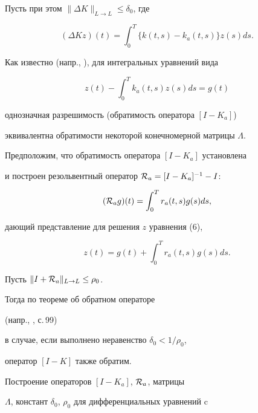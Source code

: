 %


Пусть при этом $\|\Delta K\|_{L \to L} \le \delta_0$, где


%


$$


(\Delta Kz)(t)  =  \int_0^T \{ k(t,s) - k_a(t,s) \} z(s) ds.


$$


%


Как известно (напр., \cite{Zab}), для интегральных уравнений вида


%


\begin{equation}


z(t) - \int_0^T k_a(t,s) z(s) ds = g(t)


\end{equation}


%


однозначная разрешимость (обратимость оператора $[I -K_a]$)


эквивалентна обратимости некоторой конечномерной матрицы $\Lambda$.


Предположим, что обратимость оператора $[I -K_a]$ установлена


и построен резольвентный оператор ${\cal R}_a =[I -K_a]^{-1}-I$:


%


$$


({\cal R}_a g)(t) = \int_0^T r_a(t,s) g(s) ds,


$$


%


дающий представление для решения $z$ уравнения (6),


%


$$


z(t) =g(t) + \int_0^T r_a(t,s)g(s) ds.


$$


%


Пусть $\|I+{\cal R}_a\|_{L \to L} \le \rho_0 $.


Тогда по теореме об обратном операторе


(напр., \cite{Hut}, с.\,99)


в случае, если выполнено неравенство $\delta_0<1/{\rho_0}$,


оператор $[I - K]$ также обратим.





Построение операторов $[I-K_a]$, ${\cal R}_a $, матрицы


$\Lambda$, констант $\delta_0$, $\rho_0$ для дифференциальных уравнений c


